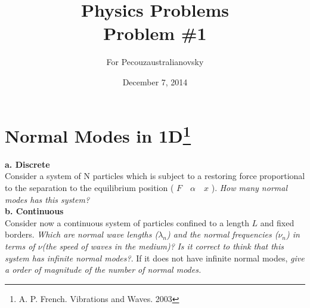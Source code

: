 \documentclass{article}
\begin{document}
\title{Physics Problems\\ Problem \#1}

\author{For Pecouzaustralianovsky}

\date{December 7, 2014}
\maketitle


\section*{Normal Modes in 1D\footnote{A. P. French. Vibrations and Waves. 2003}}

\textbf{a. Discrete}\\

Consider a system of N particles which is subject to a restoring force proportional to the separation to the equilibrium position ( $F \quad \alpha \quad x$ ). \textit{How many normal modes has this system?}\\

\textbf{b. Continuous }\\

Consider now a continuous system of particles confined to a length $L$ and fixed borders. \textit{Which are normal wave lengths ($\lambda_n$) and the normal frequencies ($\nu_n$) in terms of $\nu$(the speed of waves in the medium)?} \textit{Is it correct to think that this system has infinite normal modes?}. If it does not have infinite normal modes, \textit{give a order of magnitude of the number of normal modes.}
\end{document}
